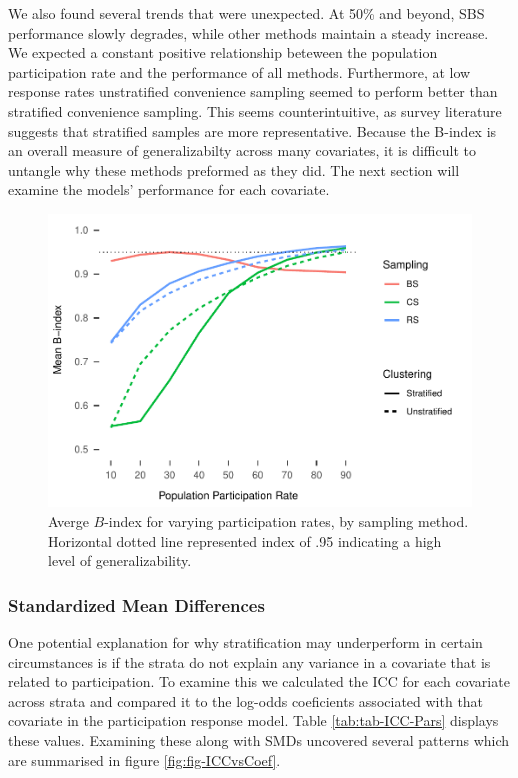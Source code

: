 \documentclass[man,floatsintext]{apa6}
\begin{document}
We also found several trends that were unexpected. At 50\% and beyond, SBS performance slowly degrades, while other methods maintain a steady increase. We expected a constant positive relationship beteween the population participation rate and the performance of all methods. Furthermore, at low response rates unstratified convenience sampling seemed to perform better than stratified convenience sampling. This seems counterintuitive, as survey literature suggests that stratified samples are more representative. Because the B-index is an overall measure of generalizabilty across many covariates, it is difficult to untangle why these methods preformed as they did. The next section will examine the models' performance for each covariate.



\begin{figure}
\centering
\includegraphics{GenSamp-Paper_files/figure-latex/fig-avg-Bindex-1.pdf}
\caption{\label{fig:fig-avg-Bindex}Averge \(B\)-index for varying participation rates, by sampling method. Horizontal dotted line represented index of .95 indicating a high level of generalizability.}
\end{figure}

\hypertarget{standardized-mean-differences}{%
\subsubsection{Standardized Mean Differences}\label{standardized-mean-differences}}

One potential explanation for why stratification may underperform in certain circumstances is if the strata do not explain any variance in a covariate that is related to participation. To examine this we calculated the ICC for each covariate across strata and compared it to the log-odds coeficients associated with that covariate in the participation response model. Table \ref{tab:tab-ICC-Pars} displays these values. Examining these along with SMDs uncovered several patterns which are summarised in figure \ref{fig:fig-ICCvsCoef}.
\end{document}
